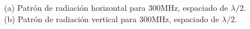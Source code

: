 \documentclass[11pt]{book}
\begin{document}
\begin{figure}[h]
	\centering
	\caption{(a) Patrón de radiación horizontal para 300MHz, espaciado de
	 $\lambda / 2$. (b) Patrón de radiación vertical  para 300MHz, espaciado de $\lambda / 2$.  }
\end{figure}
\end{document}
